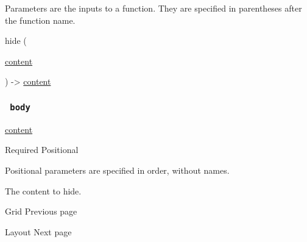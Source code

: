\label{parameters-tooltip}
Parameters are the inputs to a function. They are specified in
parentheses after the function name.

{ hide } (

{ \href{/docs/reference/foundations/content/}{content} }

) -\textgreater{} \href{/docs/reference/foundations/content/}{content}

\subsubsection{\texorpdfstring{\texttt{\ body\ }}{ body }}\label{parameters-body}

\href{/docs/reference/foundations/content/}{content}

{Required} {{ Positional }}

\label{parameters-body-positional-tooltip}
Positional parameters are specified in order, without names.

The content to hide.

\href{/docs/reference/layout/grid/}{\pandocbounded{}}

{ Grid } { Previous page }

\href{/docs/reference/layout/layout/}{\pandocbounded{}}

{ Layout } { Next page }
